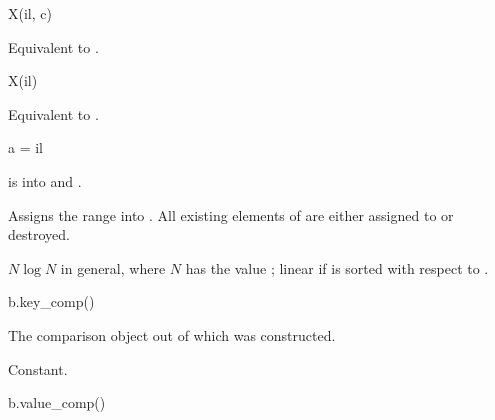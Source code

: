 %
%
%
%
\begin{itemdecl}
X(il, c)
\end{itemdecl}

\begin{itemdescr}
\pnum
\effects
Equivalent to .
\end{itemdescr}

%
%
%
%
\begin{itemdecl}
X(il)
\end{itemdecl}

\begin{itemdescr}
\pnum
\effects
Equivalent to .
\end{itemdescr}

\begin{itemdecl}
a = il
\end{itemdecl}

\begin{itemdescr}
\pnum
\result
{}

\pnum
\expects
{} is  into 
and .

\pnum
\effects
Assigns the range  into .
All existing elements of  are either assigned to or destroyed.

\pnum
\complexity
$N \log N$ in general, where $N$ has the value ;
linear if  is sorted with respect to .
\end{itemdescr}

%
\begin{itemdecl}
b.key_comp()
\end{itemdecl}

\begin{itemdescr}
\pnum
\result
{}

\pnum
\returns
The comparison object out of which  was constructed.

\pnum
\complexity
Constant.
\end{itemdescr}

%
\begin{itemdecl}
b.value_comp()
\end{itemdecl}

